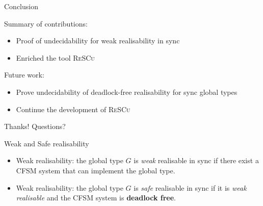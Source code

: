 \documentclass{beamer}
\begin{document}


\begin{frame}[fragile]{Conclusion}

	Summary of contributions:
	\begin{itemize}
		\item Proof of undecidability for weak realisability in sync
		\item Enriched the tool \textsc{ReSCu} 
	\end{itemize}

	\bigskip

	Future work:
	\begin{itemize}
		\item Prove undecidability of deadlock-free realisability for sync global types
		\item Continue the development of \textsc{ReSCu}
	\end{itemize}

	\bigskip

	\begin{center}
		\Large Thanks! Questions?
	\end{center}
\end{frame}

\begin{frame}{Weak and Safe realisability}
  \begin{itemize}
    \item 
    Weak realisability: the global type $G$ is \emph{weak} realisable in sync if 
    there exist a CFSM system that can implement the global type.

    \bigskip

    \item 
    Weak realisability: the global type $G$ is \emph{safe} realisable in sync if 
    it is \emph{weak realisable} and the CFSM system is \textbf{deadlock free}.

  \end{itemize}
\end{frame}
\end{document}
